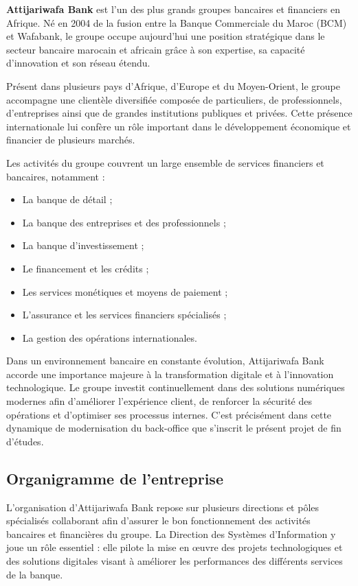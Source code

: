 \textbf{Attijariwafa Bank} est l'un des plus grands groupes bancaires et
financiers en Afrique. Né en 2004 de la fusion entre la Banque Commerciale
du Maroc (BCM) et Wafabank, le groupe occupe aujourd'hui une position
stratégique dans le secteur bancaire marocain et africain grâce à son
expertise, sa capacité d'innovation et son réseau étendu.

Présent dans plusieurs pays d'Afrique, d'Europe et du Moyen-Orient, le
groupe accompagne une clientèle diversifiée composée de particuliers, de
professionnels, d'entreprises ainsi que de grandes institutions publiques
et privées. Cette présence internationale lui confère un rôle important
dans le développement économique et financier de plusieurs marchés.

Les activités du groupe couvrent un large ensemble de services financiers
et bancaires, notamment :

\begin{itemize}
    \item La banque de détail ;
    \item La banque des entreprises et des professionnels ;
    \item La banque d'investissement ;
    \item Le financement et les crédits ;
    \item Les services monétiques et moyens de paiement ;
    \item L'assurance et les services financiers spécialisés ;
    \item La gestion des opérations internationales.
\end{itemize}

Dans un environnement bancaire en constante évolution, Attijariwafa Bank
accorde une importance majeure à la transformation digitale et à
l'innovation technologique. Le groupe investit continuellement dans des
solutions numériques modernes afin d'améliorer l'expérience client, de
renforcer la sécurité des opérations et d'optimiser ses processus internes.
C'est précisément dans cette dynamique de modernisation du back-office que
s'inscrit le présent projet de fin d'études.

\subsection*{Organigramme de l'entreprise}

L'organisation d'Attijariwafa Bank repose sur plusieurs directions et pôles
spécialisés collaborant afin d'assurer le bon fonctionnement des activités
bancaires et financières du groupe. La Direction des Systèmes d'Information
y joue un rôle essentiel : elle pilote la mise en œuvre des projets
technologiques et des solutions digitales visant à améliorer les
performances des différents services de la banque.


